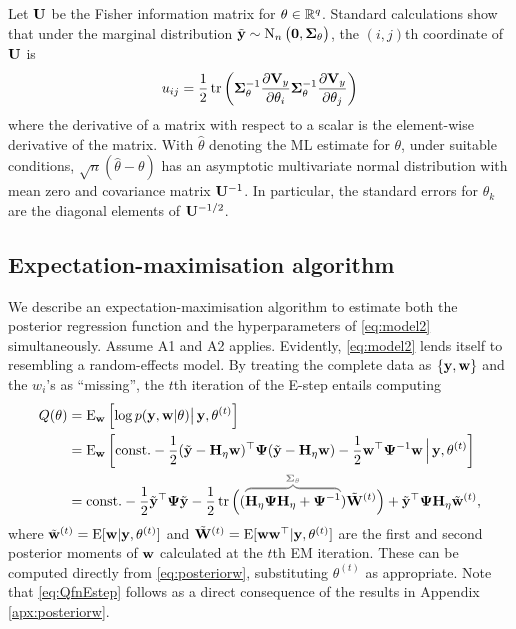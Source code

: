Let ${\mathbf U}$ be the Fisher information matrix for $\theta \in\mathbb{R}^q$.
Standard calculations show that under the marginal distribution $\tilde{{\mathbf y}} \sim \operatorname{N}_n\big({\mathbf 0}, {\bm\Sigma}_\theta \big)$, the $(i,j)$th coordinate of ${\mathbf U}$ is 
\[
  u_{ij} = 
  \frac{1}{2} \operatorname{tr}\left(
  {\bm\Sigma}_\theta^{-1} \frac{\partial{\mathbf V}_y}{\partial\theta_i}
  {\bm\Sigma}_\theta^{-1} \frac{\partial{\mathbf V}_y}{\partial\theta_j} 
  \right)
\]
where the derivative of a matrix with respect to a scalar is the element-wise derivative of the matrix.
With $\hat\theta$ denoting the ML estimate for $\theta$, under suitable conditions, $\surd n (\hat\theta - \theta)$ has an asymptotic multivariate normal distribution with mean zero and covariance matrix ${\mathbf U}^{-1}$.
In particular, the standard errors for $\theta_k$ are the diagonal elements of ${\mathbf U}^{-1/2}$.

\subsection{Expectation-maximisation algorithm}

We describe an expectation-maximisation algorithm to estimate both the posterior regression function and the hyperparameters of \eqref{eq:model2} simultaneously.
Assume A1 and A2 applies.
Evidently, \eqref{eq:model2} lends itself to resembling a random-effects model.
By treating the complete data as $\{{\mathbf y},{\mathbf w} \}$ and the $w_i$'s as ``missing'', the $t$th iteration of the E-step entails computing
%
\begin{align}
  Q(\theta) 
  &= \E_\bw \left[ \log p(\by, \bw | \theta) \big\vert\, \by,\theta^{(t)} \right] \nonumber \\
  &= \E_\bw \left[ \const - \half (\tilde\by - \bH_\eta\bw)^\top \bPsi (\tilde\by - \bH_\eta\bw)  - \half \bw^\top\bPsi^{-1}\bw 
  \,\Big\vert\, \by,\theta^{(t)} \right] \label{eq:QfnEstep} \\
  &=  \const - \half \tilde \by^\top \bPsi \tilde \by
  - \half \tr \Big( (
  {\color{gray}
  \overbrace{\color{black}
  \bH_\eta\bPsi\bH_\eta + \bPsi^{-1}
  }^{\bSigma_\theta} 
  }
  )\tilde\bW^{(t)} \Big)
  + \tilde\by^\top \bPsi\bH_\eta\wtilde^{(t)}, \nonumber
\end{align}
%
where $\tilde{{\mathbf w}}^{(t)} = \operatorname{E}[{\mathbf w}|{\mathbf y},\theta^{(t)}]$ and $\tilde{{\mathbf W}}^{(t)} = \operatorname{E}[{\mathbf w}{\mathbf w}^\top|{\mathbf y},\theta^{(t)}]$ are the first and second posterior moments of ${\mathbf w}$ calculated at the $t$th EM iteration.
These can be computed directly from \eqref{eq:posteriorw}, substituting $\theta^{(t)}$ as appropriate.
Note that \eqref{eq:QfnEstep} follows as a direct consequence of the results in Appendix \ref{apx:posteriorw}.

